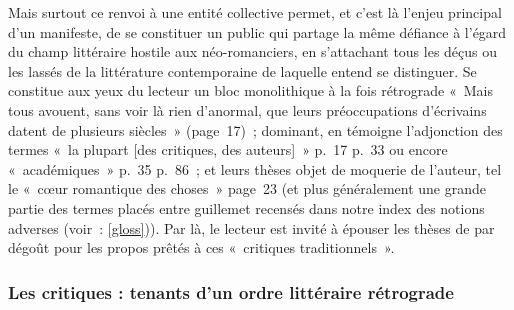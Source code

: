 Mais surtout ce renvoi à une entité collective permet, et c'est là l'enjeu principal d'un manifeste, de se constituer un public qui partage la même défiance à l'égard du champ littéraire hostile aux néo-romanciers, en s'attachant tous les déçus ou les lassés de la littérature contemporaine de laquelle \robbe{} entend se distinguer. Se constitue aux yeux du lecteur un bloc monolithique à la fois rétrograde «~Mais tous avouent, sans voir là rien d’anormal, que leurs préoccupations d’écrivains datent de plusieurs siècles~» (page~17)~; dominant, en témoigne l'adjonction des termes «~la plupart [des critiques, des auteurs]~» p.~17 p.~33 ou encore «~académiques~» p.~35 p.~86~; et leurs thèses objet de moquerie de l'auteur, tel le «~cœur romantique des choses~» page~23 (et plus généralement une grande partie des termes placés entre guillemet recensés dans notre index des notions adverses (voir~: \ref{gloss})). Par là, le lecteur est invité à épouser les thèses de \punr{} par dégoût pour les propos prêtés à ces «~critiques traditionnels~».






\subsubsection{Les critiques : tenants d'un ordre littéraire rétrograde}


